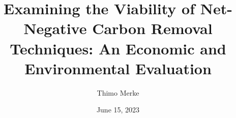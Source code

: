 \documentclass[12pt]{report}
\title{Examining the Viability of Net-Negative Carbon Removal Techniques: An Economic and Environmental Evaluation}
\author{Thimo Merke}
\date{June 15, 2023}
\begin{document}




\tableofcontents
\listoffigures
\listoftables
\newpage

\makenomenclature

\printnomenclature
\newpage

%






\appendix


\printbibliography


\end{document}
